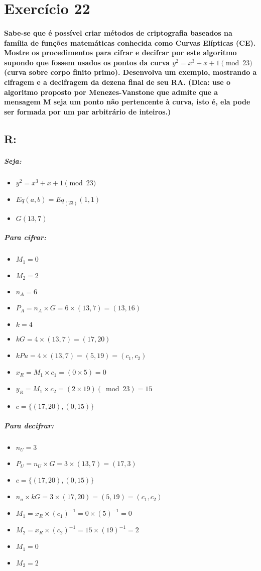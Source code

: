 \documentclass[10pt,a4paper]{report}
\begin{document}
\section*{Exercício 22}
\paragraph{Sabe-se que é possível criar métodos de criptografia baseados na família de funções matemáticas conhecida como Curvas Elípticas (CE). Mostre os procedimentos para cifrar e decifrar por este algoritmo supondo que fossem usados os pontos da curva $y^2 = x^3 + x + 1 \pmod {23} $ (curva sobre corpo finito primo). Desenvolva um exemplo, mostrando a cifragem e a decifragem da dezena final de seu RA. (Dica: use o algoritmo proposto por Menezes-Vanstone que admite que a mensagem M seja um ponto não pertencente à curva, isto é, ela pode ser formada por um par arbitrário de inteiros.)}
\subsection*{R:}
\subparagraph{Seja:}
\begin{itemize}
\item $y^2 = x^3 + x + 1 \pmod {23}$
\item $Eq(a,b) = Eq_{(23)}(1,1) $
\item $G(13,7)$ 
\end{itemize}
\subparagraph{Para cifrar:}
\begin{itemize}
\item $M_1 = 0$
\item $M_2 = 2$
\item $n_A = 6$
\item $P_A = n_A \times G = 6 \times (13,7) = (13,16)$
\item $k = 4$
\item $kG = 4 \times (13,7) = (17,20)$
\item $kPu = 4 \times (13,7) = (5,19) = (c_1,c_2) $
\item $x_R = M_1 \times c_1 = (0 \times 5) = 0$
\item $y_R = M_1 \times c_2 = (2 \times 19)(\bmod 23) = 15$
\item $c = \{(17,20),(0,15)\}$
\end{itemize}
\subparagraph{Para decifrar:}
\begin{itemize}
\item $n_U = 3$
\item $P_U = n_U \times G = 3 \times (13,7) = (17,3)$
\item $c = \{(17,20),(0,15)\}$
\item $n_u \times kG = 3 \times (17,20) = (5,19) = (c_1,c_2)$
\item $M_1 = x_R \times (c_1)^{-1} = 0 \times (5)^{-1} = 0$
\item $M_2 = x_R \times (c_2)^{-1} = 15 \times (19)^{-1} = 2$
\item $M_1 = 0$
\item $M_2 = 2$
\end{itemize}
\end{document}
